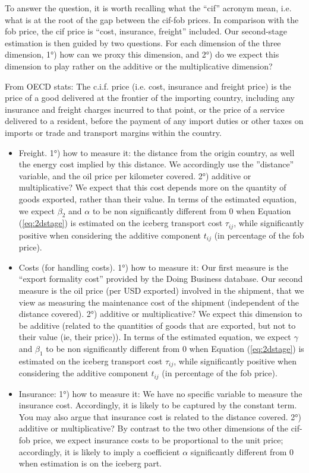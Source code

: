 \documentclass[a4paper,11pt]{article}
\begin{document}
To answer the question, it is worth recalling what the ``cif'' acronym mean, i.e. what is at the root of the gap between the cif-fob prices. In comparison with the fob price, the cif price is ``cost, insurance, freight'' included. Our second-stage estimation is then guided by two questions. For each dimension of the three dimension, 1°) how can we proxy this dimension, and 2°) do we expect this dimension to play rather on the additive or the multiplicative dimension?

From OECD stats: The c.i.f. price (i.e. cost, insurance and freight price) is the price of a good delivered at the frontier of the importing country, including any insurance and freight charges incurred to that point, or the price of a service delivered to a resident, before the payment of any import duties or other taxes on imports or trade and transport margins within the country.

\begin{itemize}

\item Freight. 1°) how to measure it: the distance from the origin country, as well the energy cost implied by this distance. We accordingly use the ''distance'' variable, and the oil price per kilometer covered. 2°) additive or multiplicative? We expect that this cost depends more on the quantity of goods exported, rather than their value. In terms of the estimated equation, we expect $\beta_2$ and $\alpha$ to be non significantly different from 0 when Equation (\ref{eq:2dstage}) is estimated on the iceberg transport cost $\tau_{ij}$, while significantly positive when considering the additive component $t_{ij}$ (in percentage of the fob price).
\item Costs (for handling costs). 1°) how to measure it: Our first measure is the ``export formality cost''  provided by the Doing Business database. Our second measure is the oil price (per USD exported) involved in the shipment, that we view as measuring the maintenance cost of the shipment (independent of the distance covered). 2°) additive or multiplicative? We expect this dimension to be additive (related to the quantities of goods that are exported, but not to their value (ie, their price)). In terms of the estimated equation, we expect $\gamma$ and $\beta_1$ to be non significantly different from 0 when Equation (\ref{eq:2dstage}) is estimated on the iceberg transport cost $\tau_{ij}$, while significantly positive when considering the additive component $t_{ij}$ (in percentage of the fob price).
\item Insurance: 1°) how to measure it: We have no specific variable to measure the insurance cost. Accordingly, it is likely to be captured by the constant term. You may also argue that insurance cost is related to the distance covered. 2°) additive or multiplicative? By contrast to the two other dimensions of the cif-fob price, we expect insurance costs to be proportional to the unit price; accordingly, it is likely to imply a coefficient $\alpha$ significantly different from 0 when estimation is on the iceberg part. 

\end{itemize}
\end{document}
